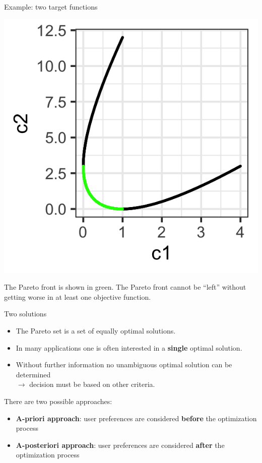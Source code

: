 \begin{frame}[allowframebreaks]{Example: two target functions}
    \begin{center}
    \includegraphics[scale=0.2]{images/graph3}
    \end{center}
    \vspace*{-0.3cm}

The Pareto front is shown in green.
The Pareto front cannot be \enquote{left} without getting worse in at least one objective function.

\end{frame}


\begin{frame}{Two solutions}

\begin{itemize}
\item The Pareto set is a set of equally optimal solutions.
\item In many applications one is often interested in a \textbf{single} optimal solution.
\item Without further information no unambiguous optimal solution can be determined \\
$\to$ decision must be based on other criteria.
\end{itemize}

There are two possible approaches:
\begin{itemize}
\item \textbf{A-priori approach}: user preferences are considered \textbf{before} the optimization process
\item \textbf{A-posteriori approach}: user preferences are considered \textbf{after} the optimization process
\end{itemize}

\end{frame}

